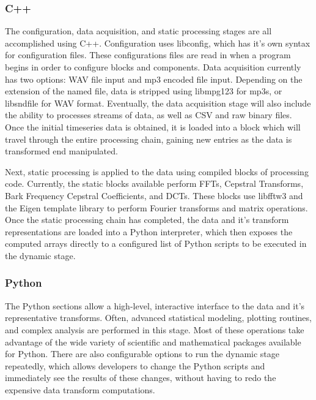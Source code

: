\documentclass[journal]{IEEEtran}
\begin{document}
\subsubsection{C++}
The configuration, data acquisition, and static processing stages are all accomplished using C++. Configuration uses libconfig, which 
has it's own syntax for configuration files. These configurations files are read in when a program begins in order to configure blocks and 
components. Data acquisition currently has two options: WAV file input and mp3 encoded file input. Depending on the extension of the named file, 
data is stripped using libmpg123 for mp3s, or libsndfile for WAV format. Eventually, the data acquisition stage will also include the ability to processes streams of data, as well as CSV and raw binary files. Once the initial timeseries data is obtained, it is loaded into a block which will travel through the entire processing chain, gaining new entries as the data is transformed end manipulated. 

Next, static processing is applied to the data using compiled blocks of processing code. Currently, the static blocks available perform FFTs, 
Cepstral Transforms, Bark Frequency Cepstral Coefficients, and DCTs. These blocks use libfftw3 and the Eigen template library to perform 
Fourier transforms and matrix operations. Once the static processing chain has completed, the data and it's transform representations are 
loaded into a Python interpreter, which then exposes the computed arrays directly to a configured list of Python scripts to be executed in the dynamic
stage.

\subsubsection{Python}
The Python sections allow a high-level, interactive interface to the data and it's representative transforms. Often, advanced statistical modeling, 
plotting routines, and complex analysis are performed in this stage. Most of these operations take advantage of the wide variety of scientific 
and mathematical packages available for Python. There are also configurable options to run the dynamic stage repeatedly, which allows developers to change the Python scripts and immediately see the results of these changes, without having to redo the expensive data transform computations.
\end{document}
